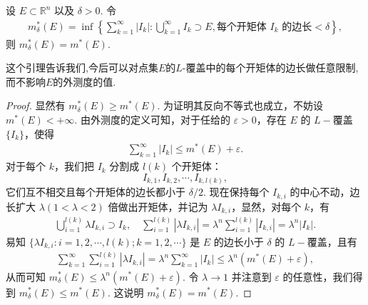 \documentclass[../../main.tex]{subfiles}
\begin{document}
\begin{lemma}
设 \(E \subset \mathbb{R}^n\) 以及 \(\delta > 0\). 令
\begin{align*}
m^*_{\delta}(E) = \inf\left\{ \sum_{k = 1}^{\infty} |I_k| : \bigcup_{k = 1}^{\infty} I_k \supset E, \text{每个开矩体 } I_k \text{ 的边长} < \delta \right\},
\end{align*}
则 \(m^*_{\delta}(E)=m^*(E)\).
\end{lemma}
\begin{note}
这个引理告诉我们,今后可以对点集$E$的$L$-覆盖中的每个开矩体的边长做任意限制,而不影响$E$的外测度的值.
\end{note}
\begin{proof}
显然有 \(m^*_{\delta}(E) \geq m^*(E)\). 为证明其反向不等式也成立，不妨设 \(m^*(E)< + \infty\). 由外测度的定义可知，对于任给的 \(\varepsilon > 0\)，存在 \(E\) 的 \(L -\)覆盖 \(\{I_k\}\)，使得
\begin{align*}
\sum_{k = 1}^{\infty} |I_k| \leq m^*(E) + \varepsilon.
\end{align*}
对于每个 \(k\)，我们把 \(I_k\) 分割成 \(l(k)\) 个开矩体：
\[
I_{k,1}, I_{k,2}, \cdots, I_{k,l(k)},
\]
它们互不相交且每个开矩体的边长都小于 \(\delta/2\). 现在保持每个 \(I_{k,i}\) 的中心不动，边长扩大 \(\lambda(1 < \lambda < 2)\) 倍做出开矩体，并记为 \(\lambda I_{k,i}\)，显然，对每个 \(k\)，有
\begin{align*}
\bigcup_{i = 1}^{l(k)} \lambda I_{k,i} \supset I_k, \quad \sum_{i = 1}^{l(k)} |\lambda I_{k,i}| = \lambda^n \sum_{i = 1}^{l(k)} |I_{k,i}| = \lambda^n |I_k|.
\end{align*}
易知 \(\{\lambda I_{k,i} : i = 1,2,\cdots, l(k); k = 1,2,\cdots\}\) 是 \(E\) 的边长小于 \(\delta\) 的 \(L -\)覆盖，且有
\begin{align*}
\sum_{k = 1}^{\infty} \sum_{i = 1}^{l(k)} |\lambda I_{k,i}| = \lambda^n \sum_{k = 1}^{\infty} |I_k| \leq \lambda^n (m^*(E) + \varepsilon),
\end{align*}
从而可知 \(m^*_{\delta}(E) \leq \lambda^n (m^*(E) + \varepsilon)\). 令 \(\lambda \to 1\) 并注意到 \(\varepsilon\) 的任意性，我们得到 \(m^*_{\delta}(E) \leq m^*(E)\). 这说明 \(m^*_{\delta}(E)=m^*(E)\).
\end{proof}
\end{document}
